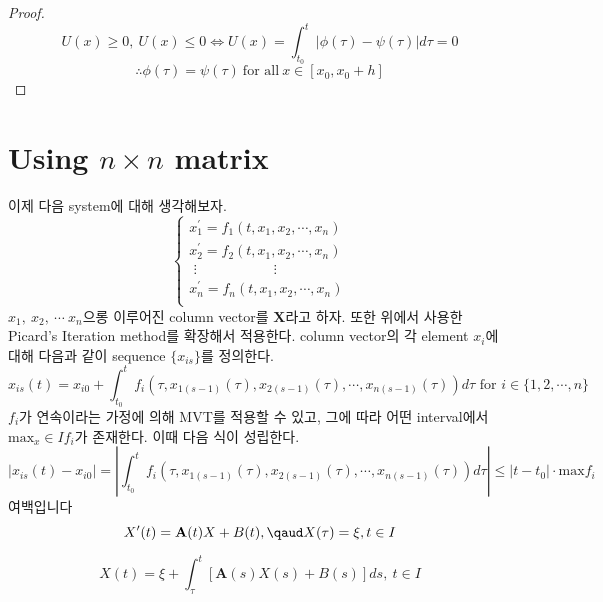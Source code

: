 \documentclass[a4paper,10pt]{article}
\begin{document}
\begin{proof}
\begin{displaymath}
    U(x) \geq 0, \ U(x) \leq 0 \iff U(x) = \int_{t_0}^{t}|\phi(\tau) - \psi(\tau)| d\tau = 0
\end{displaymath}
\begin{displaymath}
    \therefore
    \phi(\tau) = \psi(\tau) \ \text{for all} \ x \in [x_0, x_0 + h]
\end{displaymath}
\end{proof}

\section{Using $n \times n$ matrix}
이제 다음 system에 대해 생각해보자.
\begin{equation}
    \begin{cases}
    x_1^{\prime} = f_1(t, x_1, x_2, \cdots, x_n) \\
    x_2^{\prime} = f_2(t, x_1, x_2, \cdots, x_n) \\
    \,\, \vdots \qquad\qquad\quad\, \, \, \vdots \\
    x_n^{\prime} = f_n(t, x_1, x_2, \cdots, x_n) \\
    \end{cases}
\end{equation}
$x_1, \  x_2, \  \cdots \ x_n$으롱 이루어진 column vector를 $\mathbf{X}$라고 하자. 또한 위에서 사용한 Picard's Iteration method를 확장해서 적용한다. column vector의 각 element $x_i$에 대해 다음과 같이 sequence $\{x_{is}\}$를 정의한다.
\begin{displaymath}
    x_{is}(t) = x_{i0} + \int_{t_0}^{t} f_i(\tau, x_{1(s-1)}(\tau), x_{2(s-1)}(\tau), \cdots, x_{n(s-1)}(\tau)) d \tau \text{\ for $i \in \{ 1, 2, \cdots, n\}$}
\end{displaymath}
$f_i$가 연속이라는 가정에 의해 MVT를 적용할 수 있고, 그에 따라 어떤 interval에서  $\text{max}_x \in I f_i$가 존재한다. 이때 다음 식이 성립한다.
\begin{displaymath}
     | x_{is}(t) - x_{i0} | = \left| \int_{t_0}^{t} f_i(\tau, x_{1(s-1)}(\tau), x_{2(s-1)}(\tau), \cdots, x_{n(s-1)}(\tau)) d \tau \right| \leq |t - t_0| \cdot \text{max}f_i
\end{displaymath}
여백입니다
\begin{displaymath}
    X^{\prime}(t) = \mathbf{A}(t)X + B(t), \text{\qaud} X(\tau) = \xi, t \in I
\end{displaymath}

\begin{displaymath}
    X(t) = \xi + \int_{\tau}^{t}[\mathbf{A}(s)X(s) + B(s)] ds, \ t \in I
\end{displaymath} 
\end{document}
